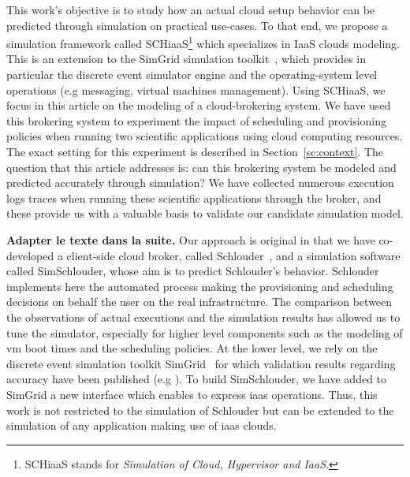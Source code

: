 This work's  objective is  to study how  an actual cloud  setup behavior  can be
predicted through simulation on practical use-cases.   To that end, we propose a
simulation framework called SCHiaaS\footnote{SCHiaaS stands for \emph{Simulation
    of Cloud, Hypervisor and IaaS}.}  which specializes in IaaS clouds modeling.
This  is an  extension  to the  SimGrid simulation  toolkit~\cite{CasanovaLQ08},
which  provides  in particular  the  discrete  event  simulator engine  and  the
operating-system level operations (e.g  messaging, virtual machines management).
Using SCHiaaS,  we focus in  this article on  the modeling of  a cloud-brokering
system.   We  have used  this  brokering  system  to  experiment the  impact  of
scheduling and  provisioning policies  when running two  scientific applications
using  cloud computing  resources.  The  exact  setting for  this experiment  is
described in Section~\ref{sc:context}. The  question that this article addresses
is:  can this  brokering  system  be modeled  and  predicted accurately  through
simulation? We have collected numerous  execution logs traces when running these
scientific applications through the broker, and these provide us with a valuable
basis to validate our candidate simulation model.

\textbf{Adapter le  texte dans la suite.}   Our approach is original  in that we
have co-developed a client-side  cloud broker, called Schlouder~\cite{Michon17},
and  a  simulation  software  called  SimSchlouder,  whose  aim  is  to  predict
Schlouder's behavior.   Schlouder implements  here the automated  process making
the  provisioning and  scheduling  decisions  on behalf  the  user  on the  real
infrastructure.  The  comparison between  the observations of  actual executions
and the simulation results has allowed  us to tune the simulator, especially for
higher  level components  such as  the modeling  of \ac{vm}  boot times  and the
scheduling  policies.  At  the  lower  level, we  rely  on  the  discrete  event
simulation  toolkit  SimGrid~\cite{CasanovaLQ08}  for which  validation  results
regarding accuracy  have been published  (e.g \cite{StanisicTLVM15,VelhoSCL13}).
To build SimSchlouder, we have added to SimGrid a new interface which enables to
express  \ac{iaas}  operations.  Thus,  this  work  is  not  restricted  to  the
simulation of Schlouder but can be extended to the simulation of any application
making use of \ac{iaas} clouds.

